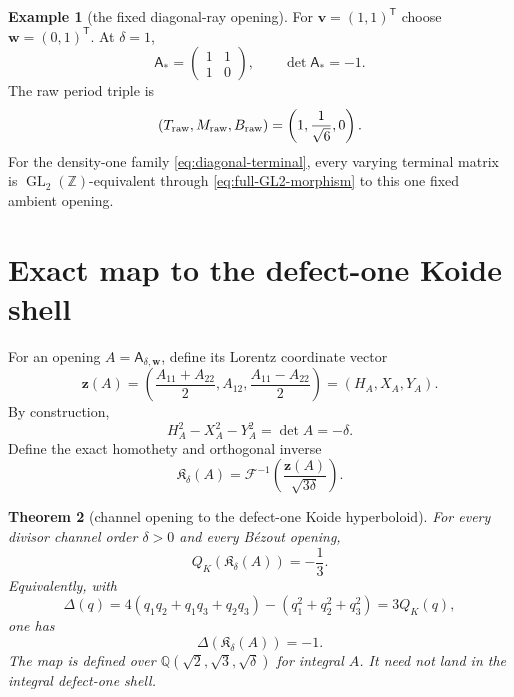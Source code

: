 \documentclass[11pt]{article}
\newtheorem{theorem}{Theorem}[section]
\theoremstyle{definition}
\newtheorem{example}[theorem]{Example}
\theoremstyle{remark}
\newcommand{\Z}{\mathbb Z}
\newcommand{\Q}{\mathbb Q}
\newcommand{\GL}{\operatorname{GL}}
\newcommand{\1}{\mathbf 1}
\newcommand{\mat}[4]{\begin{pmatrix}#1&#2\\#3&#4\end{pmatrix}}
\begin{document}
\begin{example}[the fixed diagonal-ray opening]
For $\mathbf v=(1,1)^{\mathsf T}$ choose
$\mathbf w=(0,1)^{\mathsf T}$.  At $\delta=1$,
\begin{equation}\label{eq:Astar}
 \mathsf A_*=\mat{1}{1}{1}{0},\qquad \det\mathsf A_*=-1.
\end{equation}
The raw period triple is
\[
 (T_{\rm raw},M_{\rm raw},B_{\rm raw})
 =\left(1,\frac1{\sqrt6},0\right).
\]
For the density-one family \eqref{eq:diagonal-terminal}, every varying
terminal matrix is $\GL_2(\Z)$-equivalent through
\eqref{eq:full-GL2-morphism} to this one fixed ambient opening.
\end{example}

\section{Exact map to the defect-one Koide shell}

For an opening $A=\mathsf A_{\delta,\mathbf w}$, define its Lorentz coordinate
vector
\begin{equation}\label{eq:zA}
 \mathbf z(A)=
 \left(
 \frac{A_{11}+A_{22}}2,
 A_{12},
 \frac{A_{11}-A_{22}}2
 \right)=(H_A,X_A,Y_A).
\end{equation}
By construction,
\begin{equation}\label{eq:QAminusdelta}
 H_A^2-X_A^2-Y_A^2=\det A=-\delta.
\end{equation}
Define the exact homothety and orthogonal inverse
\begin{equation}\label{eq:defect-map}
 \mathfrak K_\delta(A)
 =\mathcal F^{-1}\left(\frac{\mathbf z(A)}{\sqrt{3\delta}}\right).
\end{equation}

\begin{theorem}[channel opening to the defect-one Koide hyperboloid]
\label{thm:defect-one-map}
For every divisor channel order $\delta>0$ and every Bézout opening,
\begin{equation}\label{eq:QKminus-third}
 Q_K(\mathfrak K_\delta(A))=-\frac13.
\end{equation}
Equivalently, with
\begin{equation}\label{eq:Delta}
 \Delta(q)=4(q_1q_2+q_1q_3+q_2q_3)-(q_1^2+q_2^2+q_3^2)=3Q_K(q),
\end{equation}
one has
\begin{equation}\label{eq:Deltaminus1}
 \boxed{\Delta(\mathfrak K_\delta(A))=-1.}
\end{equation}
The map is defined over
$\Q(\sqrt2,\sqrt3,\sqrt\delta)$ for integral $A$.  It need not land in the
integral defect-one shell.
\end{theorem}
\end{document}
